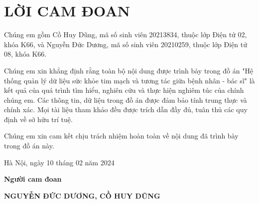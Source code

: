 \section*{LỜI CAM ĐOAN} %
\thispagestyle{empty}

Chúng em gồm Cồ Huy Dũng, mã số sinh viên 20213834, thuộc lớp Điện tử 02, khóa K66, và Nguyễn Đức Dương, mã số sinh viên 20210259, thuộc lớp Điện tử 08, khóa K66.

Chúng em xin khẳng định rằng toàn bộ nội dung được trình bày trong đồ án "Hệ thống quản lý dữ liệu sức khỏe tim mạch và tương tác giữa bệnh nhân - bác sĩ" là kết quả của quá trình tìm hiểu, nghiên cứu và thực hiện nghiêm túc của chính chúng em.
Các thông tin, dữ liệu trong đồ án được đảm bảo tính trung thực và chính xác. Mọi tài liệu tham khảo đều được trích dẫn đầy đủ, tuân thủ các quy định về sở hữu trí tuệ. 

Chúng em xin cam kết chịu trách nhiệm hoàn toàn về nội dung đã trình bày trong đồ án này.


\vspace{6pt}

\hspace{8cm}Hà Nội, ngày 10 tháng 02 năm 2024

\hspace{9.8cm}\textbf{Người cam đoan}

\vspace{2cm}
\hspace{7.3cm}\textbf{NGUYỄN ĐỨC DƯƠNG,  CỒ HUY DŨNG}

\cleardoublepage